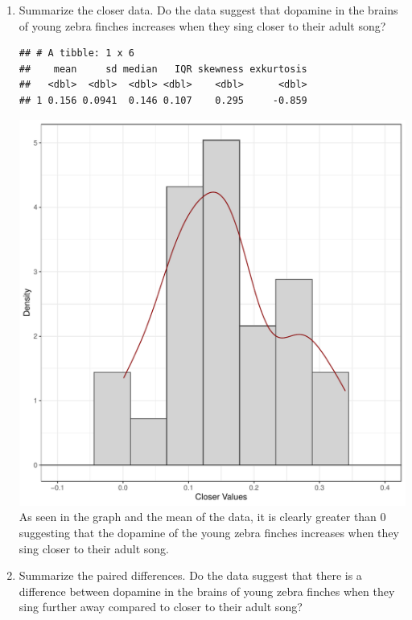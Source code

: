 \documentclass{article}\usepackage[]{graphicx}\usepackage[]{xcolor}
\makeatletter
\def\maxwidth{ %
  \ifdim\Gin@nat@width>\linewidth
    \linewidth
  \else
    \Gin@nat@width
  \fi
}
\newenvironment{kframe}{%
 \def\at@end@of@kframe{}%
 \ifinner\ifhmode%
  \def\at@end@of@kframe{\end{minipage}}%
  \begin{minipage}{\columnwidth}%
 \fi\fi%
 \def\FrameCommand##1{\hskip\@totalleftmargin \hskip-\fboxsep
 \colorbox{shadecolor}{##1}\hskip-\fboxsep
     \hskip-\linewidth \hskip-\@totalleftmargin \hskip\columnwidth}%
 \MakeFramed {\advance\hsize-\width
   \@totalleftmargin\z@ \linewidth\hsize
   \@setminipage}}%
 {\par\unskip\endMakeFramed%
 \at@end@of@kframe}
\newenvironment{knitrout}{}{} %
\makeatother
\begin{document}
\begin{enumerate}
\begin{enumerate}
   \item Summarize the closer data. Do the data suggest that
   dopamine in the brains of young zebra finches increases when
   they sing closer to their adult song?
\begin{knitrout}
\color{fgcolor}\begin{kframe}
\begin{verbatim}
## # A tibble: 1 x 6
##    mean     sd median   IQR skewness exkurtosis
##   <dbl>  <dbl>  <dbl> <dbl>    <dbl>      <dbl>
## 1 0.156 0.0941  0.146 0.107    0.295     -0.859
\end{verbatim}
\end{kframe}
\end{knitrout}

\begin{knitrout}
\color{fgcolor}
\includegraphics[width=\maxwidth]{figure/unnamed-chunk-7-1} 
\end{knitrout}
As seen in the graph and the mean of the data, it is clearly greater than 0 suggesting that the dopamine of the young zebra finches increases when they sing closer to their adult song.
  \item Summarize the paired differences. Do the data suggest
  that there is a difference between dopamine in the brains of
  young zebra finches when they sing further away compared to 
  closer to their adult song?
  



\end{enumerate}
\end{enumerate}
\end{document}
